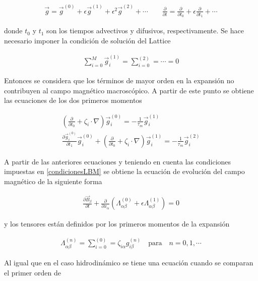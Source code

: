 \begin{eqnarray}
    \vec{g} = \vec{g}^{(0)} + \epsilon\vec{g}^{(1)} + \epsilon^{2}\vec{g}^{(2)}+\cdots\qquad \frac{\partial}{\partial t} = \frac{\partial}{\partial t_{0}} + \epsilon\frac{\partial}{\partial t_{1}}+\cdots
\end{eqnarray}

\noindent donde $t_{0}$ y $t_{1}$ son los tiempos advectivos y difusivos, respectivamente. Se hace necesario imponer la condición de solución del Lattice

\begin{eqnarray}
    \label{condicionesLBM}
    \sum_{i=0}^{M}\vec{g}_{i}^{(1)} = \sum_{i=0}^{(2)} = \cdots=0
\end{eqnarray}

\noindent Entonces se considera que los términos de mayor orden en la expansión no contribuyen al campo magnético macroscópico. A partir de este punto se obtiene las ecuaciones de los dos primeros momentos

\begin{eqnarray}
    \left(\frac{\partial}{\partial t_{0}}+\zeta_{i}\cdot\nabla\right)\vec{g}_{i}^{(0)} = -\frac{1}{\tau_{m}}\vec{g}_{i}^{(1)}\\
    \frac{\partial \vec{g}_{i}^{(0)}}{\partial t_{1}}\vec{g}_{i}^{(0)}+\left(\frac{\partial}{\partial t_{0}}+\zeta_{i}\cdot\nabla\right)\vec{g}_{i}^{(1)} = -\frac{1}{\tau_{m}}\vec{g}_{i}^{(2)}
\end{eqnarray}

\noindent A partir de las anteriores ecuaciones y teniendo en cuenta las condiciones impuestas en \eqref{condicionesLBM} se obtiene la ecuación de evolución del campo magnético de la siguiente forma

\begin{eqnarray}
    \label{1ermomentoMHD}
    \frac{\partial \vec{B}_{\beta}}{\partial t} + \frac{\partial}{\partial x_{\alpha}}\left(\Lambda_{\alpha\beta}^{(0)}+\epsilon\Lambda_{\alpha\beta}^{(1)}\right) = 0
\end{eqnarray}

\noindent y los tensores están definidos por los primeros momentos de la expansión 

\begin{eqnarray}
    \Lambda_{\alpha\beta}^{(n)}=\sum_{i=0}^{(0)} = \zeta_{i\alpha}g_{i\beta}^{(n)}\quad \text{para}\quad n=0,1,\cdots
\end{eqnarray}

Al igual que en el caso hidrodinámico se tiene una ecuación cuando se comparan el primer orden de 

